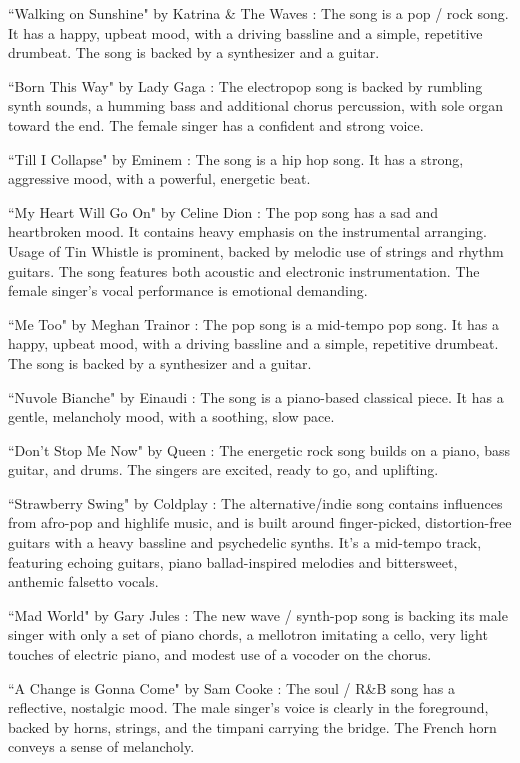 \documentclass[nohyperref]{article}
\theoremstyle{plain}
\theoremstyle{definition}
\theoremstyle{remark}
\begin{document}
``Walking on Sunshine" by Katrina \& The Waves :
The song is a pop / rock song. It has a happy, upbeat mood, with a driving bassline and a simple, repetitive drumbeat. The song is backed by a synthesizer and a guitar. 

``Born This Way" by Lady Gaga :
The electropop song is backed by rumbling synth sounds, a humming bass and additional chorus percussion, with sole organ toward the end. The female singer has a confident and strong voice. 

``Till I Collapse" by Eminem :
The song is a hip hop song. It has a strong, aggressive mood, with a powerful, energetic beat. 

``My Heart Will Go On" by Celine Dion :
The pop song has a sad and heartbroken mood. It contains heavy emphasis on the instrumental arranging. Usage of Tin Whistle is prominent, backed by melodic use of strings and rhythm guitars. The song features both acoustic and electronic instrumentation. The female singer's vocal performance is emotional demanding. 

``Me Too" by Meghan Trainor :
The pop song is a mid-tempo pop song. It has a happy, upbeat mood, with a driving bassline and a simple, repetitive drumbeat. The song is backed by a synthesizer and a guitar. 

``Nuvole Bianche" by Einaudi :
The song is a piano-based classical piece. It has a gentle, melancholy mood, with a soothing, slow pace. 

``Don't Stop Me Now" by Queen :
The energetic rock song builds on a piano, bass guitar, and drums. The singers are excited, ready to go, and uplifting. 

``Strawberry Swing" by Coldplay :
The alternative/indie song contains influences from afro-pop and highlife music, and is built around finger-picked, distortion-free guitars with a heavy bassline and psychedelic synths. It's a mid-tempo track, featuring echoing guitars, piano ballad-inspired melodies and bittersweet, anthemic falsetto vocals. 

``Mad World" by Gary Jules :
The new wave / synth-pop song is backing its male singer with only a set of piano chords, a mellotron imitating a cello, very light touches of electric piano, and modest use of a vocoder on the chorus. 

``A Change is Gonna Come" by Sam Cooke :
The soul / R\&B song has a reflective, nostalgic mood. The male singer's voice is clearly in the foreground, backed by horns, strings, and the timpani carrying the bridge. The French horn conveys a sense of melancholy. 
\end{document}
